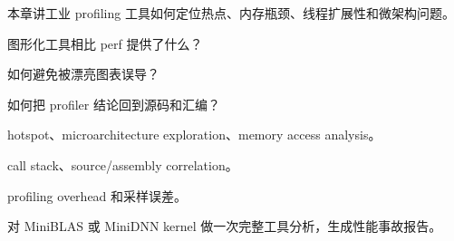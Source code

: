 {本章讲工业 profiling 工具如何定位热点、内存瓶颈、线程扩展性和微架构问题。}
{\item 图形化工具相比 perf 提供了什么？
\item 如何避免被漂亮图表误导？
\item 如何把 profiler 结论回到源码和汇编？}
{\item hotspot、microarchitecture exploration、memory access analysis。
\item call stack、source/assembly correlation。
\item profiling overhead 和采样误差。}
{对 MiniBLAS 或 MiniDNN kernel 做一次完整工具分析，生成性能事故报告。}
